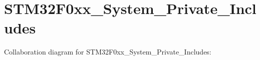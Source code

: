 \hypertarget{group___s_t_m32_f0xx___system___private___includes}{}\section{S\+T\+M32\+F0xx\+\_\+\+System\+\_\+\+Private\+\_\+\+Includes}
\label{group___s_t_m32_f0xx___system___private___includes}
Collaboration diagram for S\+T\+M32\+F0xx\+\_\+\+System\+\_\+\+Private\+\_\+\+Includes\+:
